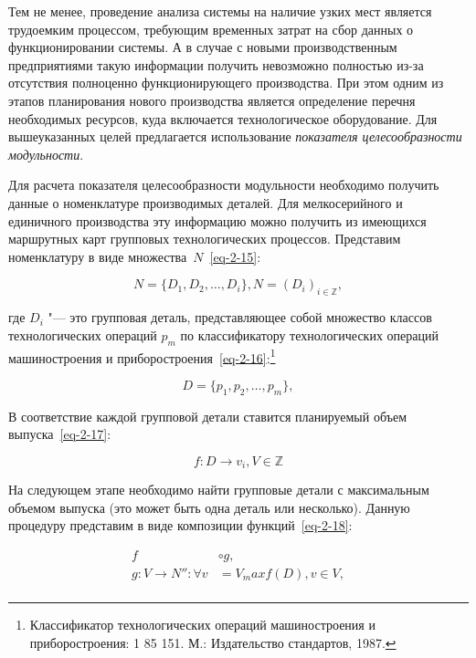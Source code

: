 Тем не менее, проведение анализа системы на наличие узких мест является трудоемким процессом, требующим временных затрат на сбор данных о функционировании системы. А в случае с новыми производственным предприятиями такую информации получить невозможно полностью из-за отсутствия полноценно функционирующего производства. При этом одним из этапов планирования нового производства является определение перечня необходимых ресурсов, куда включается технологическое оборудование. Для вышеуказанных целей предлагается использование \textit{показателя целесообразности модульности}. 

Для расчета показателя целесообразности модульности необходимо получить данные о номенклатуре производимых деталей. Для мелкосерийного и единичного производства эту информацию можно получить из имеющихся маршрутных карт групповых технологических процессов. Представим номенклатуру в виде множества~$N$~\cref{eq-2-15}:

\begin{equation}
N = \{D_1, D_2, \ldots, D_i\}, N = (D_i)_{i \in \mathbb{Z}},
\label{eq-2-15}
\end{equation}


где $D_i$ "--- это групповая деталь, представляющее собой множество классов технологических операций $p_m$ по классификатору технологических операций машиностроения и приборостроения~\cref{eq-2-16}:\footnote{Классификатор технологических операций машиностроения и приборостроения: 1 85 151. М.: Издательство стандартов, 1987.}

\begin{equation}
D = \{p_1, p_2, \ldots, p_m\},
\label{eq-2-16}
\end{equation}

\noindent В соответствие каждой групповой детали ставится планируемый объем выпуска~\cref{eq-2-17}:

\begin{equation}
f: D \rightarrow v_i, V \in \mathbb{Z}
\label{eq-2-17}
\end{equation}

На следующем этапе необходимо найти групповые детали с максимальным объемом выпуска (это может быть одна деталь или несколько). Данную процедуру представим в виде композиции функций~\cref{eq-2-18}:

\begin{equation}
\begin{split}
f &\circ g, \\
g: V \rightarrow N'': \forall v &= V_max f(D), v \in V, \\
\end{split}
\label{eq-2-18}
\end{equation}

